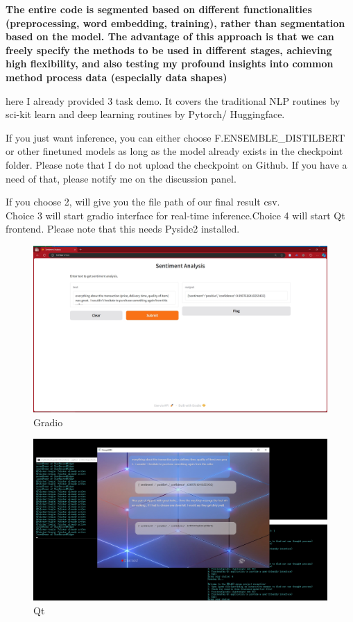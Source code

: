 \documentclass{article}
\begin{document}
\begin{flushleft}
\textbf{The entire code is segmented based on different functionalities (preprocessing, word embedding, training), rather than segmentation based on the model. The advantage of this approach is that we can freely specify the methods to be used in different stages, achieving high flexibility, and also testing my profound insights into common method process data (especially data shapes)} 

here I already provided 3 task demo. It covers the traditional NLP routines by sci-kit learn and deep learning routines by Pytorch/ Huggingface.

If you just want inference, you can either choose F.ENSEMBLE\_DISTILBERT or other finetuned models as long as the model already exists in the checkpoint folder. Please note that I do not upload the checkpoint on Github. If you have a need of that, please notify me on the discussion panel.

If you choose 2, will give you the file path of our final result csv.
\\[6mm]Choice 3 will start gradio interface for real-time inference.Choice 4 will start Qt frontend. Please note that this needs Pyside2 installed.

\begin{figure}[ht]
    \centering
    \includegraphics[width=1.0\linewidth]{choice3_gradio_frontend.png}
    \caption{Gradio}
    \label{fig:AA3}
\end{figure}

\begin{figure}[ht]
    \centering
    \includegraphics[width=1.0\linewidth]{choice4_qt_frontend.png}
    \caption{Qt}
    \label{fig:AA4}
\end{figure}

\end{flushleft}
\end{document}
